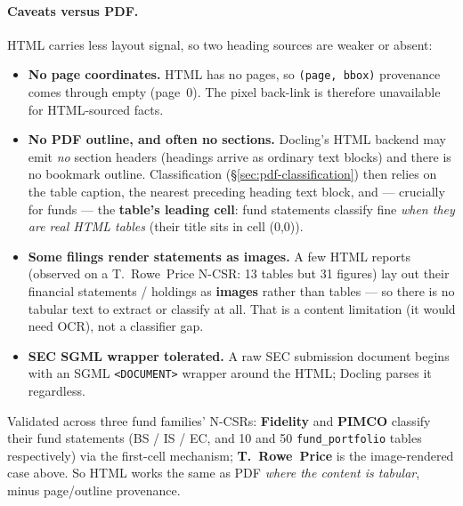 \documentclass[11pt,a4paper]{report}
\begin{document}
\paragraph{Caveats versus PDF.} HTML carries less layout signal, so two heading sources are weaker or
absent:
\begin{itemize}
  \item \textbf{No page coordinates.} HTML has no pages, so \texttt{(page, bbox)} provenance comes through
    empty (page~0). The pixel back-link is therefore unavailable for HTML-sourced facts.
  \item \textbf{No PDF outline, and often no sections.} Docling's HTML backend may emit \emph{no} section
    headers (headings arrive as ordinary text blocks) and there is no bookmark outline. Classification
    (\S\ref{sec:pdf-classification}) then relies on the table caption, the nearest preceding heading text
    block, and --- crucially for funds --- the \textbf{table's leading cell}: fund statements classify fine
    \emph{when they are real HTML tables} (their title sits in cell (0,0)).
  \item \textbf{Some filings render statements as images.} A few HTML reports (observed on a T.~Rowe~Price
    N-CSR: 13 tables but 31 figures) lay out their financial statements / holdings as \textbf{images}
    rather than tables --- so there is no tabular text to extract or classify at all. That is a content
    limitation (it would need OCR), not a classifier gap.
  \item \textbf{SEC SGML wrapper tolerated.} A raw SEC submission document begins with an SGML
    \texttt{<DOCUMENT>} wrapper around the HTML; Docling parses it regardless.
\end{itemize}

\noindent Validated across three fund families' N-CSRs: \textbf{Fidelity} and \textbf{PIMCO} classify their
fund statements (BS / IS / EC, and 10 and 50 \texttt{fund\_portfolio} tables respectively) via the
first-cell mechanism; \textbf{T.~Rowe~Price} is the image-rendered case above. So HTML works the same as
PDF \emph{where the content is tabular}, minus page/outline provenance.
\end{document}
